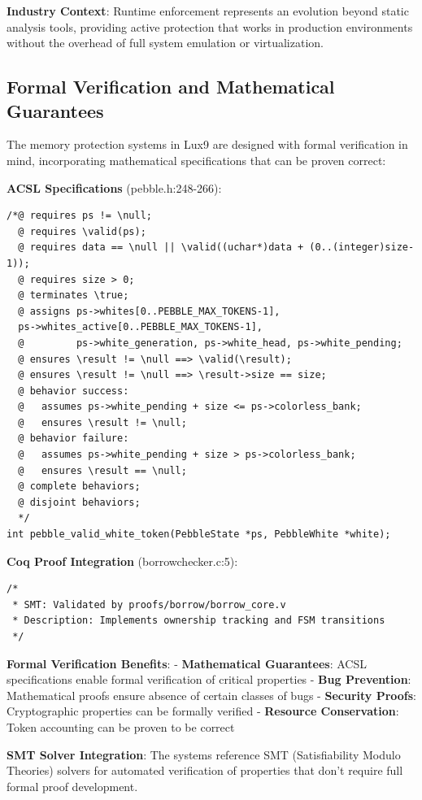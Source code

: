 \documentclass[11pt,letterpaper]{article}
\begin{document}
\textbf{Industry Context}: Runtime enforcement represents an evolution beyond static analysis tools, providing active protection that works in production environments without the overhead of full system emulation or virtualization.

\subsection{Formal Verification and Mathematical Guarantees}

The memory protection systems in Lux9 are designed with formal verification in mind, incorporating mathematical specifications that can be proven correct:

\textbf{ACSL Specifications} (pebble.h:248-266):

\begin{lstlisting}
/*@ requires ps != \null;
  @ requires \valid(ps);
  @ requires data == \null || \valid((uchar*)data + (0..(integer)size-1));
  @ requires size > 0;
  @ terminates \true;
  @ assigns ps->whites[0..PEBBLE_MAX_TOKENS-1],
  ps->whites_active[0..PEBBLE_MAX_TOKENS-1],
  @         ps->white_generation, ps->white_head, ps->white_pending;
  @ ensures \result != \null ==> \valid(\result);
  @ ensures \result != \null ==> \result->size == size;
  @ behavior success:
  @   assumes ps->white_pending + size <= ps->colorless_bank;
  @   ensures \result != \null;
  @ behavior failure:
  @   assumes ps->white_pending + size > ps->colorless_bank;
  @   ensures \result == \null;
  @ complete behaviors;
  @ disjoint behaviors;
  */
int pebble_valid_white_token(PebbleState *ps, PebbleWhite *white);
\end{lstlisting}

\textbf{Coq Proof Integration} (borrowchecker.c:5):

\begin{lstlisting}
/*
 * SMT: Validated by proofs/borrow/borrow_core.v
 * Description: Implements ownership tracking and FSM transitions
 */
\end{lstlisting}

\textbf{Formal Verification Benefits}:
- \textbf{Mathematical Guarantees}: ACSL specifications enable formal verification of critical properties
- \textbf{Bug Prevention}: Mathematical proofs ensure absence of certain classes of bugs
- \textbf{Security Proofs}: Cryptographic properties can be formally verified
- \textbf{Resource Conservation}: Token accounting can be proven to be correct

\textbf{SMT Solver Integration}: The systems reference SMT (Satisfiability Modulo Theories) solvers for automated verification of properties that don't require full formal proof development.
\end{document}
